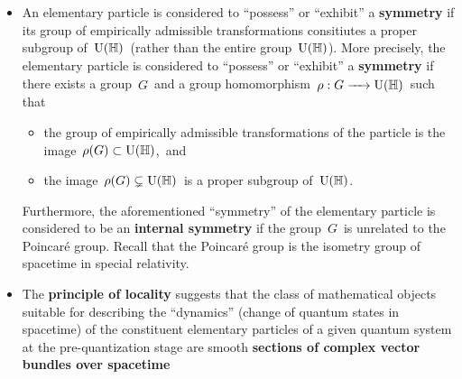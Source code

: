 \begin{itemize}
	if it converts the coordinatization of \,$\mathbb{H}$\, by one observer to that of
	another observer. Heuristically, we expect the collection of the empirically admissible
	transformations to form a group (under composition); or more precisely,
	the emipirically admissible transformations are expected to form a subgroup of \,$\U(\mathbb{H})$.\,
\item
	An elementary particle is considered to ``possess'' or ``exhibit''
	a \textbf{symmetry} if its group of empirically admissible transformations consitiutes
	a proper subgroup of \,$\U(\mathbb{H})$\,
	(rather than the entire group \,$\U(\mathbb{H})$).
	\vskip -0.01cm
	\noindent
	More precisely, the elementary particle is considered to ``possess'' or ``exhibit''
	a \textbf{symmetry} if there exists a group \,$G$\, and a group homomorphism
	\,$\rho : G \xrightarrow{{\color{white}222}} \U(\mathbb{H})$\,
	such that
	\renewcommand{\labelitemii}{$\circ$}
	\begin{itemize}
	\item
		the group of empirically admissible transformations of the particle is the image
		\,$\rho(G) \subset \textnormal{U}(\mathbb{H})$,\, and
	\item
		the image \,$\rho(G) \subsetneq \textnormal{U}(\mathbb{H})$\, is a proper subgroup of \,$\U(\mathbb{H})$.\,
	\end{itemize}
	Furthermore, the aforementioned ``symmetry'' of the elementary particle
	is considered to be an \textbf{internal symmetry} if the group \,$G$\, is unrelated
	to the Poincaré group.
	Recall that the Poincaré group is the isometry group of spacetime in special relativity.
\item
	The \textbf{\color{red}principle of locality} suggests that the class of mathematical objects
	suitable for describing the ``dynamics'' (change of quantum states in spacetime)
	of the constituent elementary particles of a given quantum system
	at the pre-quantization stage are smooth
	\textbf{\color{red}sections of complex vector bundles over spacetime}

\end{itemize}
